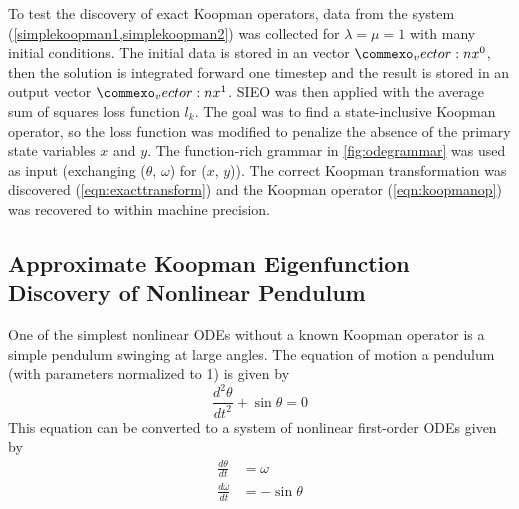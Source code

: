 \documentclass{article}
\renewcommand{\vec}[1]{\vect{#1}}
\begin{document}
To test the discovery of exact Koopman operators, data from the system (\cref{simplekoopman1,simplekoopman2}) was collected for $\lambda = \mu = 1$ with many initial conditions. The initial data is stored in an vector $\vec{x}^0$, then the solution is integrated forward one timestep and the result is stored in an output vector $\vec{x}^1$. SIEO was then applied with the average sum of squares loss function $l_k$. The goal was to find a state-inclusive Koopman operator, so the loss function was modified to penalize the absence of the primary state variables $x$ and $y$. The function-rich grammar in \cref{fig:odegrammar} was used as input (exchanging ($\theta$, $\omega$) for ($x$, $y$)). The correct Koopman transformation was discovered (\cref{eqn:exacttransform}) and the Koopman operator (\cref{eqn:koopmanop}) was recovered to within machine precision.


\subsection{Approximate Koopman Eigenfunction Discovery of Nonlinear Pendulum}
One of the simplest nonlinear ODEs without a known Koopman operator is a simple pendulum swinging at large angles. The equation of motion a pendulum (with parameters normalized to 1) is given by
\begin{equation}
\frac{d^2 \theta}{d t^2} + \sin \theta = 0 \end{equation}
This equation can be converted to a system of nonlinear first-order ODEs given by
\begin{align}
\frac{d\theta}{dt} &= \omega \\
\frac{d\omega}{dt} &= -\sin \theta
\end{align}
\end{document}
